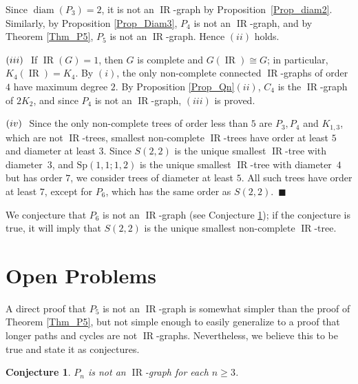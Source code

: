 \documentclass[12pt]{article}%
\newtheorem{conjecture}{Conjecture}
\begin{document}
Since $\operatorname{diam}(P_{3})=2$, it is not an $\operatorname{IR}$-graph
by Proposition~\ref{Prop_diam2}. Similarly, by Proposition \ref{Prop_Diam3},
$P_{4}$ is not an $\operatorname{IR}$-graph, and by Theorem \ref{Thm_P5},
$P_{5}$ is not an $\operatorname{IR}$-graph. Hence $(ii)$ holds.

$(iii)\hspace{0.1in}$If $\operatorname{IR}(G)=1$, then $G$ is complete and
$G(\operatorname{IR})\cong G$; in particular, $K_{4}(\operatorname{IR})=K_{4}%
$. By $(i)$, the only non-complete connected $\operatorname{IR}$-graphs of
order $4$ have maximum degree $2$. By Proposition \ref{Prop_Qn}$(ii)$, $C_{4}$
is the $\operatorname{IR}$-graph of $2K_{2}$, and since $P_{4}$ is not an
$\operatorname{IR}$-graph, $(iii)$ is proved.

$(iv)\hspace{0.1in}$Since the only non-complete trees of order less than $5$
are $P_{3},P_{4}$ and $K_{1,3}$, which are not $\operatorname{IR}$-trees,
smallest non-complete $\operatorname{IR}$-trees have order at least $5$ and
diameter at least $3$. Since $S(2,2)$ is the unique smallest
$\operatorname{IR}$-tree with diameter~$3$, and $\mathrm{Sp}(1,1;1,2)$ is the
unique smallest $\operatorname{IR}$-tree with diameter~$4$ but has order $7$,
we consider trees of diameter at least $5$. All such trees have order at least
$7$, except for $P_{6}$, which has the same order as $S(2,2)$.~$\blacksquare$

\bigskip

We conjecture that $P_{6}$ is not an $\operatorname{IR}$-graph (see Conjecture
\ref{Con_paths}); if the conjecture is true, it will imply that $S(2,2)$ is
the unique smallest non-complete $\operatorname{IR}$-tree.

\section{Open Problems}

\label{Sec_Qs}A direct proof that $P_{5}$ is not an $\operatorname{IR}$-graph
is somewhat simpler than the proof of Theorem \ref{Thm_P5}, but not simple
enough to easily generalize to a proof that longer paths and cycles are not
$\operatorname{IR}$-graphs. Nevertheless, we believe this to be true and state
it as conjectures.

\begin{conjecture}
\label{Con_paths}$P_{n}$ is not an $\operatorname{IR}$-graph for each $n\geq3$.
\end{conjecture}
\end{document}
